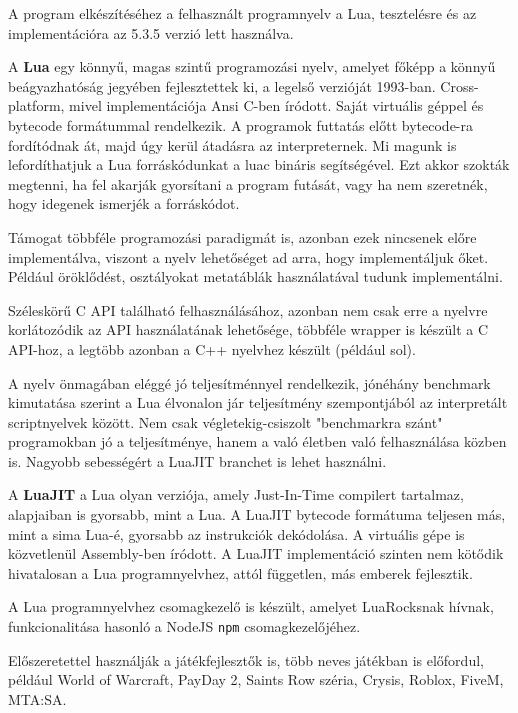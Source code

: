 
A program elkészítéséhez a felhasznált programnyelv a Lua, tesztelésre és az implementációra az 5.3.5 verzió lett használva.

A \textbf{Lua} egy könnyű, magas szintű programozási nyelv, amelyet főképp a könnyű beágyazhatóság jegyében fejlesztettek ki, a legelső verzióját 1993-ban. Cross-platform, mivel implementációja Ansi C-ben íródott. Saját virtuális géppel és bytecode formátummal rendelkezik.
A programok futtatás előtt bytecode-ra fordítódnak át, majd úgy kerül átadásra az interpreternek. Mi magunk is lefordíthatjuk a Lua forráskódunkat a luac bináris segítségével.
Ezt akkor szokták megtenni, ha fel akarják gyorsítani a program futását, vagy ha nem szeretnék, hogy idegenek ismerjék a forráskódot.

Támogat többféle programozási paradigmát is, azonban ezek nincsenek előre implementálva, viszont a nyelv lehetőséget ad arra, hogy implementáljuk őket. Például öröklődést, osztályokat metatáblák használatával tudunk implementálni. \cite{ooplua}

Széleskörű C API található felhasználásához, azonban nem csak erre a nyelvre korlátozódik az API használatának lehetősége, többféle wrapper is készült a C API-hoz, a legtöbb azonban a C++ nyelvhez készült (például sol).

A nyelv önmagában eléggé jó teljesítménnyel rendelkezik, jónéhány benchmark kimutatása szerint a Lua élvonalon jár teljesítmény szempontjából az interpretált scriptnyelvek között. Nem csak végletekig-csiszolt "benchmarkra szánt" programokban jó a teljesítménye, hanem a való életben való felhasználása közben is. Nagyobb sebességért a LuaJIT branchet is lehet használni.

A \textbf{LuaJIT} a Lua olyan verziója, amely Just-In-Time compilert tartalmaz, alapjaiban is gyorsabb, mint a Lua. A LuaJIT bytecode formátuma teljesen más, mint a sima Lua-é, gyorsabb az instrukciók dekódolása. A virtuális gépe is közvetlenül Assembly-ben íródott. A LuaJIT implementáció szinten nem kötődik hivatalosan a Lua programnyelvhez, attól független, más emberek fejlesztik. \cite {luajit}

A Lua programnyelvhez csomagkezelő is készült, amelyet LuaRocksnak hívnak, funkcionalitása hasonló a NodeJS \texttt{npm} csomagkezelőjéhez.

Előszeretettel használják a játékfejlesztők is, több neves játékban is előfordul, például World of Warcraft, PayDay 2, Saints Row széria, Crysis, Roblox, FiveM, MTA:SA. \cite{usageoflua}

